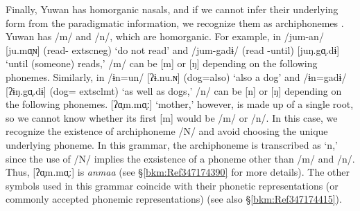 Finally, Yuwan has homorganic nasals, and if we cannot infer their underlying form from the paradigmatic information, we recognize them as archiphonemes \citep[46--49]{Lass1984}. Yuwan has /m/ and /n/, which are homorganic. For example, in /jum-an/ [ju.mɑ̟ɴ] (read-	extsc{neg}) ‘do not read’ and /jum-gadɨ/ (read -until) [juŋ.gɑ̟.dɨ] ‘until (someone) reads,’ /m/ can be [m] or [ŋ] depending on the following phonemes. Similarly, in /ɨn=un/ [ʔɨ.nu.ɴ] (dog=also) ‘also a dog’ and /ɨn=gadɨ/ [ʔɨŋ.gɑ̟.dɨ] (dog=	extsc{lmt}) ‘as well as dogs,’ /n/ can be [n] or [ŋ] depending on the following phonemes. [ʔɑ̟m.mɑ̟ː] ‘mother,’ however, is made up of a single root, so we cannot know whether its first [m] would be /m/ or /n/. In this case, we recognize the existence of archiphoneme /N/ and avoid choosing the unique underlying phoneme. In this grammar, the archiphoneme is transcribed as ‘n,’ since the use of /N/ implies the exsistence of a phoneme other than /m/ and /n/. Thus, [ʔɑ̟m.mɑ̟ː] is \textit{anmaa} (see §\ref{bkm:Ref347174390} for more details). The other symbols used in this grammar coincide with their phonetic representations (or commonly accepted phonemic representations) (see also §\ref{bkm:Ref347174415}).

